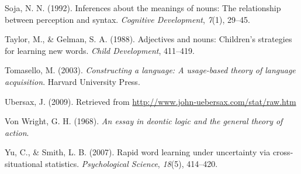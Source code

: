 \documentclass[
  ,man,floatsintext]{apa6}
\newlength{\cslhangindent}
\newlength{\cslentryspacingunit} %
\newenvironment{CSLReferences}[2] %
 {%
  \setlength{\parindent}{0pt}
  \ifodd #1
  \let\oldpar\par
  \def\par{\hangindent=\cslhangindent\oldpar}
  \fi
  \setlength{\parskip}{#2\cslentryspacingunit}
 }%
 {}
\begin{document}
\begin{CSLReferences}{1}{0}
\leavevmode{}%
Soja, N. N. (1992). Inferences about the meanings of nouns: The relationship between perception and syntax. \emph{Cognitive Development}, \emph{7}(1), 29--45.

\leavevmode{}%
Taylor, M., \& Gelman, S. A. (1988). Adjectives and nouns: Children's strategies for learning new words. \emph{Child Development}, 411--419.

\leavevmode{}%
Tomasello, M. (2003). \emph{Constructing a language: A usage-based theory of language acquisition}. Harvard University Press.

\leavevmode{}%
Ubersax, J. (2009). Retrieved from \url{http://www.john-uebersax.com/stat/raw.htm}

\leavevmode{}%
Von Wright, G. H. (1968). \emph{An essay in deontic logic and the general theory of action}.

\leavevmode{}%
Yu, C., \& Smith, L. B. (2007). Rapid word learning under uncertainty via cross-situational statistics. \emph{Psychological Science}, \emph{18}(5), 414--420.

\end{CSLReferences}
\end{document}

